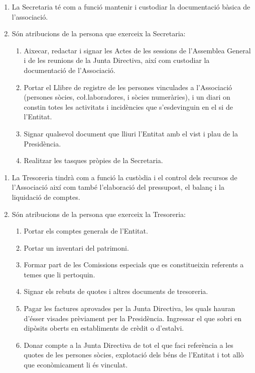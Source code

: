 \documentclass[11pt,a4paper]{article}
\newcommand{\JD}{Junta Directiva\xspace}
\newcommand{\AG}{Assemblea General\xspace}
\begin{document}

\begin{enumerate}
    \item La Secretaria té com a funció mantenir i custodiar la documentació bàsica de l'associació.
    \item Són atribucions de la persona que exerceix la Secretaria:
    \begin{enumerate}
        \item Aixecar, redactar i signar les Actes de les sessions de l'\AG i de les reunions de la \JD, així com custodiar la documentació de l'Associació.
        \item Portar el Llibre de registre de les persones vinculades a l'Associació (persones sòcies, co\l.laboradores, i sòcies numeràries), i un diari on constin totes les activitats i incidències que s'esdevinguin en el si de l'Entitat.
        \item Signar qualsevol document que lliuri l'Entitat amb el vist i plau de la Presidència.
        \item Realitzar les tasques pròpies de la Secretaria.
    \end{enumerate}
\end{enumerate}


\begin{enumerate}
    \item La Tresoreria tindrà com a funció la custòdia i el control dels recursos de l'Associació així com també l'elaboració del pressupost, el balanç i la liquidació de comptes.
    \item Són atribucions de la persona que exerceix la Tresoreria:
    \begin{enumerate}
        \item Portar els comptes generals de l'Entitat.
        \item Portar un inventari del patrimoni.
        \item Formar part de les Comissions especials que es constitueixin referents a temes que li pertoquin.
        \item Signar els rebuts de quotes i altres documents de tresoreria.
        \item Pagar les factures aprovades per la \JD, les quals hauran d'ésser visades prèviament per la Presidència. Ingressar el que sobri en dipòsits oberts en establiments de crèdit o d'estalvi.
        \item Donar compte a la \JD de tot el que faci referència a les quotes de les persones sòcies, explotació dels béns de l'Entitat i tot allò que econòmicament li és vinculat.
    \end{enumerate}
\end{enumerate}
\end{document}

